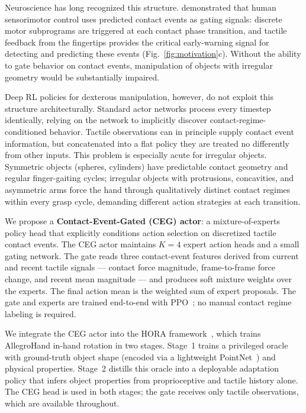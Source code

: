 \documentclass{article}
\begin{document}
Neuroscience has long recognized this structure. \citet{johansson2009} demonstrated that human
sensorimotor control uses predicted contact events as gating signals: discrete motor
subprograms are triggered at each contact phase transition, and tactile feedback from the
fingertips provides the critical early-warning signal for detecting and predicting these events
(Fig.~\ref{fig:motivation}c). Without the ability to gate behavior on contact events,
manipulation of objects with irregular geometry would be substantially impaired.

Deep RL policies for dexterous manipulation, however, do not exploit this structure
architecturally. Standard actor networks process every timestep identically, relying on the
network to implicitly discover contact-regime-conditioned behavior. Tactile observations can in
principle supply contact event information, but concatenated into a flat policy they are treated
no differently from other inputs. This problem is especially acute for irregular objects.
Symmetric objects (spheres, cylinders) have predictable contact geometry and regular
finger-gaiting cycles; irregular objects with protrusions, concavities, and asymmetric arms
force the hand through qualitatively distinct contact regimes within every grasp cycle,
demanding different action strategies at each transition.

We propose a \textbf{Contact-Event-Gated (CEG) actor}: a mixture-of-experts policy head that
explicitly conditions action selection on discretized tactile contact events. The CEG actor
maintains $K=4$ expert action heads and a small gating network. The gate reads three
contact-event features derived from current and recent tactile signals — contact force
magnitude, frame-to-frame force change, and recent mean magnitude — and produces soft mixture
weights over the experts. The final action mean is the weighted sum of expert proposals. The
gate and experts are trained end-to-end with PPO~\citep{schulman2017}; no manual contact regime
labeling is required.

We integrate the CEG actor into the HORA framework~\citep{qi2023hora}, which trains AllegroHand
in-hand rotation in two stages. Stage~1 trains a privileged oracle with ground-truth object
shape (encoded via a lightweight PointNet~\citep{qi2017pointnet}) and physical properties.
Stage~2 distills this oracle into a deployable adaptation policy that infers object properties
from proprioceptive and tactile history alone. The CEG head is used in both stages; the gate
receives only tactile observations, which are available throughout.
\end{document}
